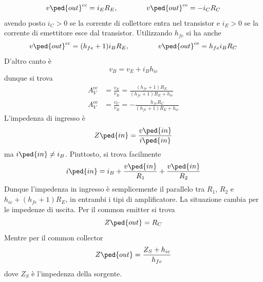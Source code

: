 \documentclass[a4paper, 11pt]{article}
\begin{document}
	\[v\ped{out}^{\text {cc}}=i_ER_E,\qquad\qquad v\ped{out}^{\text {ce}}=-i_CR_C\]
	avendo posto $i_C>0$ se la corrente di collettore entra nel transistor e $i_E>0$ se la corrente di emettitore esce dal transistor. Utilizzando $h_{fe}$ si ha anche
	\[v\ped{out}^{\text {cc}}=(h_{fe}+1)i_BR_E,\qquad\qquad v\ped{out}^{\text {ce}}=h_{fe}i_BR_C\]
	D'altro canto è
	\[v_B=v_E+i_Bh_{ie}\]
	dunque si trova
	\begin{align*}A_V^{\text {cc}}&=\frac{v_E}{v_B}=\frac{(h_{fe}+1)R_E}{(h_{fe}+1)R_E+h_{ie}}\\A_V^{\text {ce}}&=\frac{v_C}{v_B}=-\frac{h_{fe}R_C}{(h_{fe}+1)R_E+h_{ie}}\end{align*}
	L'impedenza di ingresso è
	\[Z\ped{in}=\frac{v\ped{in}}{i\ped{in}}\]
	ma $i\ped{in}\neq i_B$. Piuttosto, si trova facilmente
	\[i\ped{in}=i_B+\frac{v\ped{in}}{R_1}+\frac{v\ped{in}}{R_2}\]
	Dunque l'impedenza in ingresso è semplicemente il parallelo tra $R_1$, $R_2$ e $h_{ie}+(h_{fe}+1)R_E$, in entrambi i tipi di amplificatore. La situazione cambia per le impedenze di uscita. Per il common emitter si trova
	\[Z\ped{out}=R_C\]
	Mentre per il common collector
	\[Z\ped{out}=\frac{Z_S+h_{ie}}{h_{fe}}\]
	dove $Z_S$ è l'impedenza della sorgente.%
	\clearpage
\end{document}
